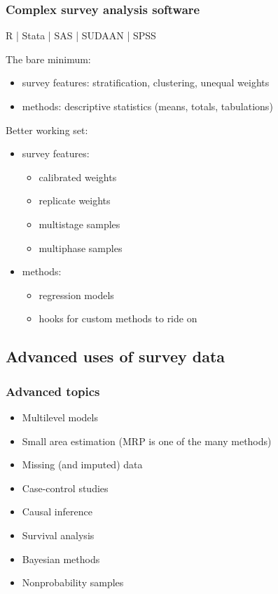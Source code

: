 \documentclass[aspectratio=43]{beamer}
\begin{document}
\begin{frame}\frametitle{Complex survey analysis software}

R | Stata | SAS | SUDAAN | SPSS

\bigskip

The bare minimum:
\begin{itemize}
    \item survey features: stratification, clustering, unequal weights
    \item methods: descriptive statistics (means, totals, tabulations)
\end{itemize}

Better working set:
\begin{itemize}
    \item survey features:
    \begin{itemize}
        \item calibrated weights
        \item replicate weights
        \item multistage samples
        \item multiphase samples
    \end{itemize}
    \item methods:
    \begin{itemize}
        \item regression models
        \item hooks for custom methods to ride on
    \end{itemize}
\end{itemize}

\end{frame}



\subsection{Advanced uses of survey data}

\begin{frame}\frametitle{Advanced topics}

\begin{itemize}
    \item Multilevel models
    \item Small area estimation (MRP is one of the many methods)
    \item Missing (and imputed) data
    \item Case-control studies
    \item Causal inference
    \item Survival analysis
    \item Bayesian methods
    \item Nonprobability samples
\end{itemize}

\end{frame}
\end{document}
